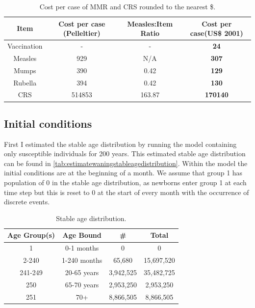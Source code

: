 \documentclass[a4paper,11pt] {scrartcl}
\begin{document}
\begin{table} [h]
\centering
\begin{tabular}{c c c c}
\toprule
Item & Cost per case (Pelleltier\cite{pelletier1998benefit}) & Measles:Item Ratio & Cost per case(US\$ 2001)\\
\midrule
Vaccination & - & - & \textbf{24}\\
Measles & 929 & N/A & \textbf{307}\\
Mumps & 390 & 0.42 & \textbf{129}\\
Rubella & 394 & 0.42 & \textbf{130}\\
CRS & 514853 & 163.87 & \textbf{170140}\\ 
\bottomrule
\end{tabular}
\caption{Cost per case of MMR and CRS rounded to the nearest \$.}
\label{tab:estimateparametercosts}
\end{table}

\subsection{Initial conditions}
\label{subsec:estimateparametersinitialconditions}
First I estimated the stable age distribution by running the model containing only susceptible individuals for 200 years. This estimated stable age distribution can be found in \autoref{tab:estimatewaningstableagedistribution}. Within the model the initial conditions are at the beginning of a month. We assume that group 1 has population of 0 in the stable age distribution, as newborns enter group 1 at each time step but this is reset to 0 at the start of every month with the occurrence of discrete events.

\begin{table} [h]
\centering
\begin{tabular}{c c c c}
\toprule
Age Group(s) & Age Bound & \# & Total\\
\midrule
1 & 0-1 months & 0 & 0\\
2-240 & 1-240 months & 65,680 & 15,697,520 \\
241-249 & 20-65 years & 3,942,525 & 35,482,725\\
250 & 65-70 years & 2,953,250 & 2,953,250\\
251 & 70+ & 8,866,505 & 8,866,505\\
\bottomrule
\end{tabular}
\caption{Stable age distribution.}
\label{tab:estimatewaningstableagedistribution}
\end{table}
\end{document}
